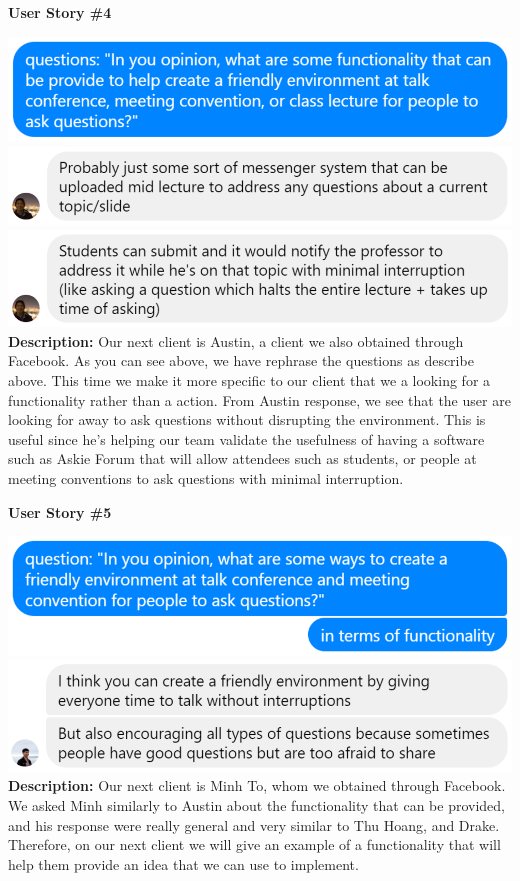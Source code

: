 \documentclass[12pt]{article}
\begin{document}
\textbf{User Story \#4}
\begin{flushleft}
\includegraphics[width=\textwidth]{Assignment5_userstory_4a.eps}
\includegraphics[width=\textwidth]{Assignment5_userstory_4b.eps}
\includegraphics[width=\textwidth]{Assignment5_userstory_4c.eps}
\textbf{Description:} Our next client is Austin, a client we also obtained through Facebook. As you can see above, we have rephrase the questions as describe above. This time we make it more specific to our client that we a looking for a functionality rather than a action. From Austin response, we see that the user are looking for away to ask questions without disrupting the environment. This is useful since he's helping our team validate the usefulness of having a software such as Askie Forum that will allow attendees such as students, or people at meeting conventions to ask questions with minimal interruption.\newline
\end{flushleft}

\textbf{User Story \#5}
\begin{flushleft}
\includegraphics[width=\textwidth]{Assignment5_userstory_5a.eps}
\includegraphics[width=\textwidth]{Assignment5_userstory_5b.eps}
\textbf{Description:} Our next client is Minh To, whom we obtained through Facebook. We asked Minh similarly to Austin about the functionality that can be provided, and his response were really general and very similar to Thu Hoang, and Drake. Therefore, on our next client we will give an example of a functionality that will help them provide an idea that we can use to implement.\newline
\end{flushleft}
\end{document}
